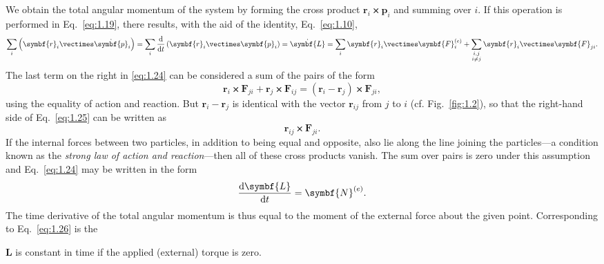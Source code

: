 We obtain the total angular momentum of the system by forming the cross product \(\symbf{r}_i\vectimes\symbf{p}_i\) and summing over \(i\). If this operation is performed in Eq.~\eqref{eq:1.19}, there results, with the aid of the identity, Eq.~\eqref{eq:1.10},
\begin{equation}
    \sum_i\left(\symbf{r}_i\vectimes\dot{\symbf{p}}_i\right)=\sum_i\odv*{\left(\symbf{r}_i\vectimes\symbf{p}_i\right)}{t}=\dot{\symbf{L}}=\sum_i\symbf{r}_i\vectimes\symbf{F}_i^{\left(e\right)}+\sum_{\substack{i,j\\i\ne j}}\symbf{r}_i\vectimes\symbf{F}_{ji}.\label{eq:1.24}
\end{equation}
The last term on the right in \eqref{eq:1.24} can be considered a sum of the pairs of the form
\begin{equation}
    \symbf{r}_i\vectimes\symbf{F}_{ji}+\symbf{r}_j\vectimes\symbf{F}_{ij}=\left(\symbf{r}_i-\symbf{r}_j\right)\vectimes\symbf{F}_{ji},\label{eq:1.25}
\end{equation}
using the equality of action and reaction. But \(\symbf{r}_i-\symbf{r}_j\) is identical with the vector \(\symbf{r}_{ij}\) from \(j\) to \(i\) (cf. Fig.~\ref{fig:1.2}), so that the right-hand side of Eq.~\eqref{eq:1.25} can be written as
\begin{equation*}
    \symbf{r}_{ij}\vectimes\symbf{F}_{ji}.
\end{equation*}
If the internal forces between two particles, in addition to being equal and opposite, also lie along the line joining the particles---a condition known as the \emph{strong law of action and reaction}---then all of these cross products vanish. The sum over pairs is zero under this assumption and Eq.~\eqref{eq:1.24} may be written in the form
\begin{equation}
    \odv{\symbf{L}}{t}=\symbf{N}^{\left(e\right)}.\label{eq:1.26}
\end{equation}
The time derivative of the total angular momentum is thus equal to the moment of the external force about the given point. Corresponding to Eq.~\eqref{eq:1.26} is the
\begin{theorem}
    \(\symbf{L}\) is constant in time if the applied (external) torque is zero.
\end{theorem}

